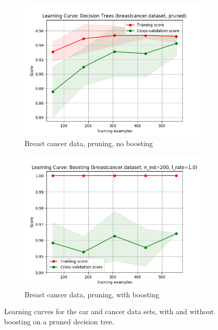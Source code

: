 \documentclass{article}
\begin{document}
\begin{figure}[htb]
    \medskip

    \begin{subfigure}{0.5\textwidth}
      \includegraphics[width=\linewidth]{out/decision_tree_pruning/breastcancer-prune-learning.png}
      \caption{Breast cancer data, pruning, no boosting}
      \label{fig:boosting-perf-3}
    \end{subfigure}\hfil
    \begin{subfigure}{0.5\textwidth}
      \includegraphics[width=\linewidth]{out/boosting/breastcancer-estimators-200.png}
      \caption{Breast cancer data, pruning, with boosting}
      \label{fig:boosting-perf-4}
    \end{subfigure}

    \caption{Learning curves for the car and cancer data sets, with and without boosting on a pruned decision tree.}
    \label{fig:boosting-perf}
    \end{figure}
\end{document}
